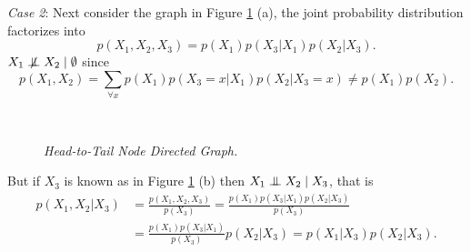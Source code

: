 \begin{exmp}
\textit{Case 2}: Next consider the graph in Figure \ref{fig:case2} (a), the joint probability distribution factorizes into
$$
 p(X_1,X_2,X_3)= p(X_1) p(X_3|X_1) p(X_2|X_3).
$$
$X_1\nCI X_2\mid \emptyset$ since
$$
 p(X_1,X_2)=\sum_{\forall x} p(X_1) p(X_3=x|X_1) p(X_2|X_3=x)\neq  p(X_1) p(X_2).
$$
\begin{figure}
\begin{minipage}[c]{\textwidth}
\centering
\begin{subfigure}[b]{.5\textwidth}
\centering
{}
\end{subfigure}\\[1cm]
\begin{subfigure}[b]{.5\textwidth}
\centering
{}
\end{subfigure}
\end{minipage}
\caption[Head-to-Tail Node Directed Graph]{\it Head-to-Tail Node Directed Graph.}
\label{fig:case2}
\end{figure}
But if $X_3$ is known as in Figure \ref{fig:case2} (b) then $X_1\mathrel{\perp\mspace{-10mu}\perp} X_2\mid X_3$, that is\vspace{.2cm}
$$
\begin{aligned}
 p(X_1,X_2|X_3)&=\frac{ p(X_1,X_2,X_3)}{ p(X_3)}=\frac{ p(X_1) p(X_3|X_1) p(X_2|X_3)}{ p(X_3)}\\
&= \frac{ p(X_1) p(X_3|X_1)}{ p(X_3)} p(X_2|X_3)= p(X_1|X_3) p(X_2|X_3).
\end{aligned}
$$\vspace{-.5cm}


\end{exmp}
